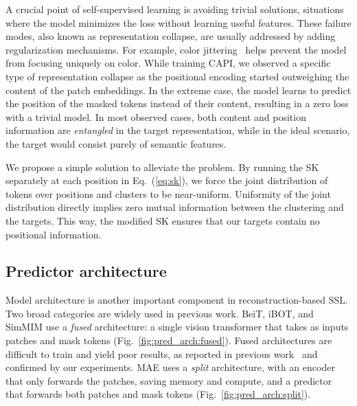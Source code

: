 
A crucial point of self-supervised learning is avoiding trivial solutions, \ie situations where the model minimizes the loss without learning useful features.
These failure modes, also known as representation collapse, are usually addressed by adding regularization mechanisms.
For example, color jittering~\citep{simclr} helps prevent the model from focusing uniquely on color.
While training CAPI, we observed a specific type of representation collapse as the positional encoding started outweighing the content of the patch embeddings.
In the extreme case, the model learns to predict the position of the masked tokens instead of their content, resulting in a zero loss with a trivial model.
In most observed cases, both content and position information are \emph{entangled} in the target representation, while in the ideal scenario, the target would consist purely of semantic features.

We propose a simple solution to alleviate the problem. 
By running the SK separately at each position in Eq.~(\ref{eq:sk}), we force the joint distribution of tokens over positions and clusters to be near-uniform.
Uniformity of the joint distribution directly implies zero mutual information between the clustering and the targets.
This way, the modified SK ensures that our targets contain no positional information.


\subsection{Predictor architecture}
\label{sec:predictor-arch}







Model architecture is another important component in reconstruction-based SSL.
Two broad categories are widely used in previous work.
BeiT, iBOT, and SimMIM use a \emph{fused} architecture: a single vision transformer that takes as inputs patches and mask tokens (Fig.~\ref{fig:pred_arch:fused}).
Fused architectures are difficult to train and yield poor results, as reported in previous work~\citep{ibot} and confirmed by our experiments.
MAE uses a \emph{split} architecture, with an encoder that only forwards the patches, saving memory and compute, and a predictor that forwards both patches and mask tokens (Fig.~\ref{fig:pred_arch:split}).

